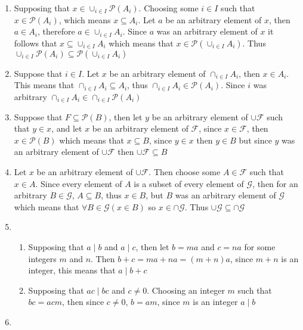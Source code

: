 \begin{enumerate}
    \item
    Supposing that $x \in \cup_{ i \in I} \mathscr{P} (A_i)$. Choosing some $i \in I$ such that $x \in \mathscr{P} (A_i)$, which means $x \subseteq A_i$. Let $a$ be an arbitrary element of $x$, then $a \in A_i$, therefore $a \in \cup_{i \in I} A_i$. Since $a$ was an arbitrary element of $x$ it follows that $x \subseteq \cup_{i \in I} A_i$ which means that $x \in \mathscr{P} (\cup_{i \in I} A_i)$. Thus $\cup_{i \in I} \mathscr{P} (A_i) \subseteq \mathscr{P} (\cup_{i \in I} A_i )$
    \item
    Suppose that $i \in I$. Let $x$ be an arbitrary element of $\cap_{i \in I} A_i$, then $x \in A_i$. This means that $\cap_{i \in I} A_i \subseteq A_i$, thus $\cap_{i \in I} A_i \in \mathscr{P} (A_i)$. Since $i$ was arbitrary $\cap_{i \in I} A_i \in \cap_{i \in I} \mathscr{P} (A_i)$
    \item
    Suppose that $F \subseteq \mathscr{P}(B)$, then let $y$ be an arbitrary element of $\cup \mathscr{F}$ such that $y \in x$, and let $x$ be an arbitrary element of $\mathscr{F}$, since $x \in \mathscr{F}$, then $x \in \mathscr{P} (B)$ which means that $x \subseteq B$, since $y \in x$ then $y \in B$ but since $y$ was an arbitrary element of $\cup \mathscr{F}$ then $\cup \mathscr{F} \subseteq B$
    \item
    Let $x$ be an arbitrary element of $\cup \mathscr{F}$. Then choose some $A \in \mathscr{F}$ such that $x \in A$. Since every element of $A$ is a subset of every element of $\mathscr{G}$, then for an arbitrary $B \in \mathscr{G}$, $A \subseteq B$, thus $x \in B$, but $B$ was an arbitrary element of $\mathscr{G}$ which means that $\forall B \in \mathscr{G} (x \in B)$ so $x \in \cap \mathscr{G}$. Thus $\cup \mathscr{G} \subseteq \cap \mathscr{G}$
    \item
    \begin{enumerate}
        \item 
    Supposing that $a \mid b$ and $a \mid c$, then let $b = ma$ and $c = na$ for some integers $m$ and $n$. Then $b + c = ma + na = (m + n)a$, since $m+n$ is an integer, this means that $a \mid b+c$
        \item 
    Supposing that $ac \mid bc$ and $c \neq 0$. Choosing an integer $m$ such that $bc = acm$, then since $c \neq 0$, $b = am$, since $m$ is an integer $a \mid b$
    \end{enumerate}
    \item
    \begin{enumerate}

\end{enumerate}
\end{enumerate}
